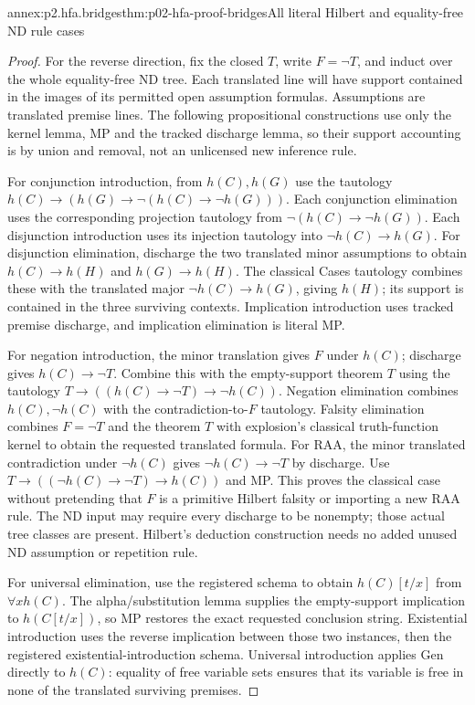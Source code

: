 \begin{annexitem}{annex:p2.hfa.bridges}{thm:p02-hfa-proof-bridges}{All literal Hilbert and equality-free ND rule cases}
\begin{proof}
For the reverse direction, fix the closed \(T\), write \(F=\neg T\),
and induct over the whole equality-free ND tree. Each translated line
will have support contained in the images of its permitted open
assumption formulas. Assumptions are translated premise lines.
The following propositional constructions use only the kernel lemma,
MP and the tracked discharge lemma, so their support accounting is
by union and removal, not an unlicensed new inference rule.

For conjunction introduction, from \(h(C),h(G)\) use the tautology
\(h(C)\to(h(G)\to\neg(h(C)\to\neg h(G)))\).
Each conjunction elimination uses the corresponding projection
tautology from \(\neg(h(C)\to\neg h(G))\).
Each disjunction introduction uses its injection tautology into
\(\neg h(C)\to h(G)\). For disjunction elimination, discharge
the two translated minor assumptions to obtain \(h(C)\to h(H)\)
and \(h(G)\to h(H)\). The classical Cases tautology combines
these with the translated major \(\neg h(C)\to h(G)\), giving
\(h(H)\); its support is contained in the three surviving contexts.
Implication introduction uses tracked premise discharge, and implication
elimination is literal MP.

For negation introduction, the minor translation gives \(F\) under
\(h(C)\); discharge gives \(h(C)\to\neg T\). Combine this
with the empty-support theorem \(T\) using the tautology
\(T\to((h(C)\to\neg T)\to\neg h(C))\).
Negation elimination combines \(h(C),\neg h(C)\) with the
contradiction-to-\(F\) tautology. Falsity elimination combines
\(F=\neg T\) and the theorem \(T\) with explosion's classical
truth-function kernel to obtain the requested translated formula.
For RAA, the minor translated contradiction under \(\neg h(C)\)
gives \(\neg h(C)\to\neg T\) by discharge. Use
\(T\to((\neg h(C)\to\neg T)\to h(C))\) and MP.
This proves the classical case without pretending that \(F\) is a
primitive Hilbert falsity or importing a new RAA rule. The ND input
may require every discharge to be nonempty; those actual tree classes
are present. Hilbert's deduction construction needs no added unused
ND assumption or repetition rule.

For universal elimination, use the registered schema to obtain
\(h(C)[t/x]\) from \(\forall xh(C)\). The alpha/substitution
lemma supplies the empty-support implication to \(h(C[t/x])\),
so MP restores the exact requested conclusion string. Existential
introduction uses the reverse implication between those two instances,
then the registered existential-introduction schema. Universal
introduction applies Gen directly to \(h(C)\): equality of free
variable sets ensures that its variable is free in none of the
translated surviving premises.


\end{proof}
\end{annexitem}
